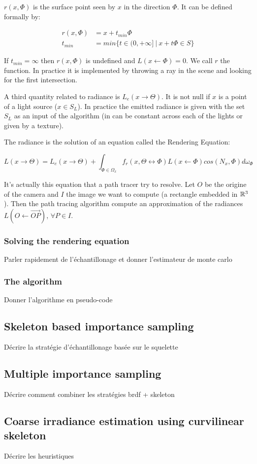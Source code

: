 $r(x, \Phi)$ is the surface point seen by $x$ in the direction $\Phi$. It can be defined formally by:

\begin{align*}
r(x, \Phi) &= x + t_{min}\Phi \\
t_{min} &= min \lbrace t \in (0, +\infty]~ |~ x + t\Phi \in S \rbrace
\end{align*}

If $t_{min} = \infty$ then $r(x, \Phi)$ is undefined and $L(x \leftarrow \Phi) = 0$. We call $r$ the  function. In practice it is implemented by throwing a ray in the scene and looking for the first intersection.

A third quantity related to radiance is  $L_e(x \rightarrow \Theta)$. It is not null if $x$ is a point of a light source ($x \in S_L$). In practice the emitted radiance is given with the set $S_L$ as an input of the algorithm (in can be constant across each of the lights or given by a texture).

The radiance is the solution of an equation called the Rendering Equation:

\begin{equation}
L(x \rightarrow \Theta) = L_e(x \rightarrow \Theta) + \int_{\Phi \in \Omega_x} f_r(x, \Theta \leftrightarrow \Phi) L(x \leftarrow \Phi) cos(N_x, \Phi) d\omega_\Phi
\end{equation}

It's actually this equation that a path tracer try to resolve. Let $O$ be the origine of the camera and $I$ the image we want to compute (a rectangle embedded in $\mathbb{R}^3$). Then the path tracing algorithm compute an approximation of the radiances $L(O \leftarrow \vec{OP})$, $\forall P \in I$.

\subsubsection{Solving the rendering equation}

Parler rapidement de l'échantillonage et donner l'estimateur de monte carlo

\subsubsection{The algorithm}

Donner l'algorithme en pseudo-code

\subsection{Skeleton based importance sampling}

Décrire la stratégie d'échantillonage basée sur le squelette

\subsection{Multiple importance sampling}

Décrire comment combiner les stratégies brdf + skeleton

\subsection{Coarse irradiance estimation using curvilinear skeleton}

Décrire les heuristiques

